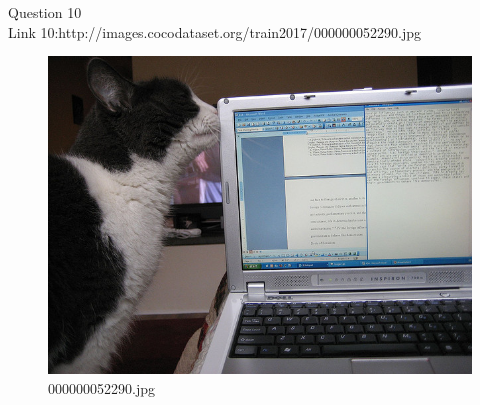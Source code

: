 Question 10\\
Link 10:http://images.cocodataset.org/train2017/000000052290.jpg
    \begin{figure}[h]
        \centering
        \includegraphics[width=0.8\linewidth]{../image set/easy/000000052290.jpg}
        \caption{000000052290.jpg}
    \end{figure}
